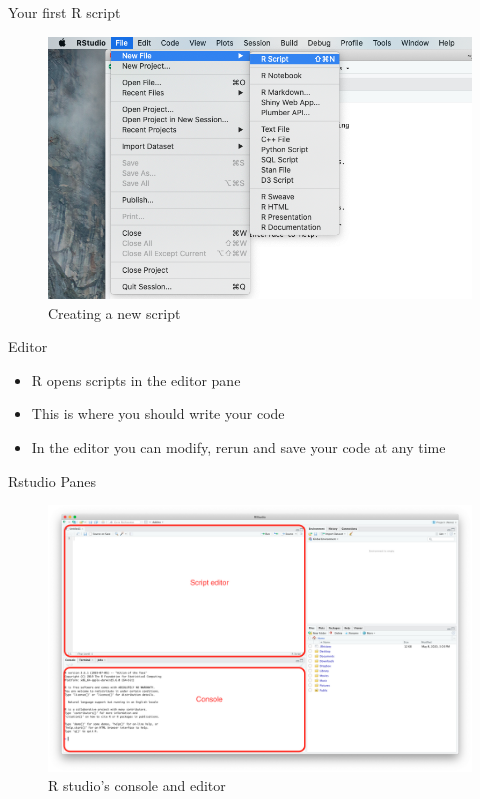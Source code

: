 \documentclass[ignorenonframetext,]{beamer}
\begin{document}
\begin{frame}{Your first R script}
\protect\hypertarget{your-first-r-script}{}

\begin{figure}
\includegraphics[scale=0.35]{figures/new-script}
\caption{Creating a new script}
\end{figure}

\end{frame}

\begin{frame}{Editor}
\protect\hypertarget{editor}{}

\begin{itemize}
\item
  R opens scripts in the editor pane
\item
  This is where you should write your code
\item
  In the editor you can modify, rerun and save your code at any time
\end{itemize}

\end{frame}

\begin{frame}{Rstudio Panes}
\protect\hypertarget{rstudio-panes}{}

\begin{figure}
\includegraphics[scale=0.18]{figures/panes}
\caption{R studio's console and editor}
\end{figure}

\end{frame}
\end{document}

